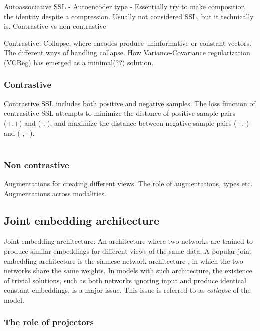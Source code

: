 \documentclass[../../thesis.tex]{subfiles}
\begin{document}
Autoassociative SSL - Autoencoder type - Essentially try to make composition the identity despite a compression. Usually not considered SSL, but it technically is. 
Contrastive vs non-contrastive

Contrastive: Collapse, where encodes produce uninformative or constant vectors. The different ways of handling collapse. How Variance-Covariance regularization (VCReg) \cite{mialon2024variance} has emerged as a minimal(??) solution. 


\subsubsection{Contrastive}
Contrastive SSL includes both positive and negative samples. The loss function of contrasitive SSL attempts to minimize the distance of positive sample pairs (+,+) and (-,-), and maximize the distance between negative sample pairs (+,-) and (-,+).\\\\

\subsubsection{Non contrastive}

Augmentations for creating different views. The role of augmentations, types etc. Augmentations across modalities. 

\subsection{Joint embedding architecture}

Joint embedding architecture: An architecture where two networks are trained to produce similar embeddings for different views of the same data. A popular joint embedding architecture is the siamese network architecture \cite{siamese}, in which the two networks share the same weights. In models with such architecture, the existence of trivial solutions, such as both networks ignoring input and produce identical constant embeddings, is a major issue. This issue is referred to as \textit{collapse} of the model.

\subsubsection{The role of projectors}
\end{document}
